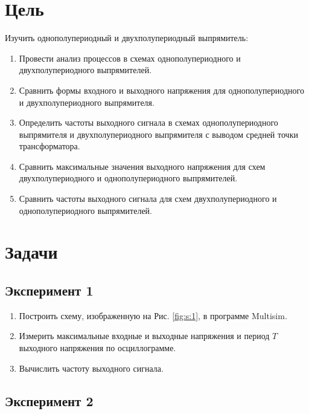 \documentclass[12pt]{article}
\begin{document}
    \newpage

    \pagestyle{plain}
    \setcounter{page}{1}

    \section*{Цель}

    Изучить однополупериодный и двухполупериодный выпрямитель:

    \begin{enumerate}
        \item Провести анализ процессов в схемах однополупериодного и двухполупериодного выпрямителей.
        \item Сравнить формы входного и выходного напряжения для однополупериодного и двухполупериодного выпрямителя.
        \item Определить частоты выходного сигнала в схемах однополупериодного выпрямителя и двухполупериодного выпрямителя с
        выводом средней точки трансформатора.
        \item Сравнить максимальные значения выходного напряжения для схем двухполупериодного и однополупериодного выпрямителей.
        \item Сравнить частоты выходного сигнала для схем двухполупериодного и однополупериодного выпрямителей.
    \end{enumerate}

    \section*{Задачи}

    \subsection*{Эксперимент 1}

    \begin{enumerate}
        \item Построить схему, изображенную на Рис. \ref{fig:s:1}, в программе Multisim.
        \item Измерить максимальные входные и выходные напряжения и период $T$ выходного напряжения по осциллограмме.
        \item Вычислить частоту выходного сигнала.
    \end{enumerate}

    \subsection*{Эксперимент 2}
\end{document}
